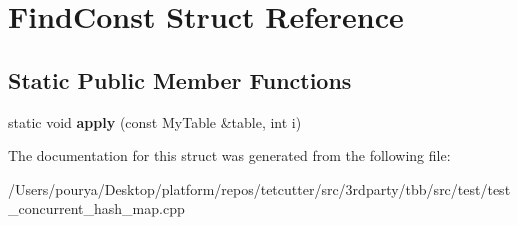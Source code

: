 \hypertarget{structFindConst}{}\section{Find\+Const Struct Reference}
\label{structFindConst}
\subsection*{Static Public Member Functions}
\begin{DoxyCompactItemize}
\item 
\hypertarget{structFindConst_a4a68621be1d486c9d72b84516ff56356}{}static void {\bfseries apply} (const My\+Table \&table, int i)\label{structFindConst_a4a68621be1d486c9d72b84516ff56356}

\end{DoxyCompactItemize}


The documentation for this struct was generated from the following file\+:\begin{DoxyCompactItemize}
\item 
/\+Users/pourya/\+Desktop/platform/repos/tetcutter/src/3rdparty/tbb/src/test/test\+\_\+concurrent\+\_\+hash\+\_\+map.\+cpp\end{DoxyCompactItemize}
